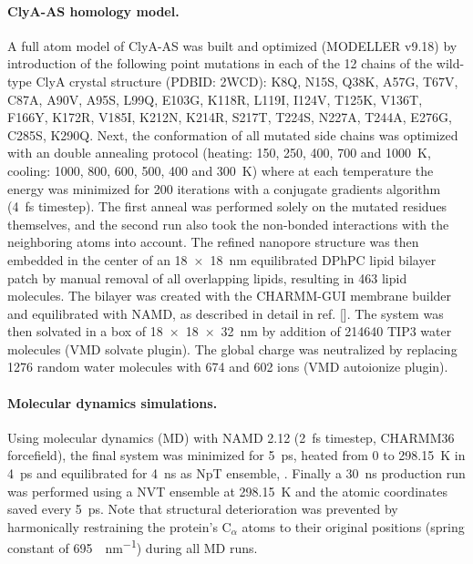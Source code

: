 \documentclass[journal=ancac3,manuscript=article,etalmode=truncate,maxauthors=0,layout=onecolumn]{achemso}
\begin{document}
\paragraph{ClyA-AS homology model.}
%
A full atom model of ClyA-AS\cite{Soskine-2013} was built and optimized (MODELLER v9.18\cite{Sali-1993}) by
introduction of the following point mutations in each of the 12 chains of the wild-type ClyA crystal structure
(PDBID: 2WCD\cite{Mueller-2009}): K8Q, N15S, Q38K, A57G, T67V, C87A, A90V, A95S, L99Q, E103G, K118R, L119I,
I124V, T125K, V136T, F166Y, K172R, V185I, K212N, K214R, S217T, T224S, N227A, T244A, E276G, C285S, K290Q. Next,
the conformation of all mutated side chains was optimized with an double annealing protocol (heating: 150,
250, 400, 700 and \SI{1000}{\kelvin}, cooling: 1000, 800, 600, 500, 400 and \SI{300}{\kelvin}) where at each
temperature the energy was minimized for 200 iterations with a conjugate gradients algorithm (\SI{4}{\fs}
timestep).\cite{Shanno-1980} The first anneal was performed solely on the mutated residues themselves, and
the second run also took the non-bonded interactions with the neighboring atoms into account. The refined
nanopore structure was then embedded in the center of an \SI{18x18}{\nm} equilibrated DPhPC lipid bilayer
patch by manual removal of all overlapping lipids, resulting in 463 lipid molecules. The bilayer was created
with the CHARMM-GUI\cite{Jo-2008} membrane builder\cite{Lee-2016} and equilibrated with
NAMD\cite{Phillips-2005}, as described in detail in ref. []. The system was then solvated in
a box of \SI{18x18x32}{\nm} by addition of 214640 TIP3 water molecules (VMD solvate plugin). The global charge
was neutralized by replacing 1276 random water molecules with 674 \Na{} and 602 \Cl{} ions (VMD autoionize
plugin).\cite{Humphrey-1996}

\paragraph{Molecular dynamics simulations.}
%
Using molecular dynamics (MD) with NAMD 2.12 (\SI{2}{\fs} timestep, CHARMM36 forcefield\cite{Best-2012}), the
final system was minimized for \SI{5}{\ps}, heated from 0 to \SI{298.15}{\kelvin} in \SI{4}{\ps} and
equilibrated for \SI{4}{\ns} as NpT ensemble, .\cite{Aksimentiev-2005} Finally a \SI{30}{\ns} production run
was performed using a NVT ensemble at \SI{298.15}{\kelvin} and the atomic coordinates saved every \SI{5}{\ps}.
Note that structural deterioration was prevented by harmonically restraining the protein's C$_\alpha$ atoms to
their original positions (spring constant of \SI{695}{\pN\per\nm}) during all MD runs.\cite{Bhattacharya-2011}
\end{document}
